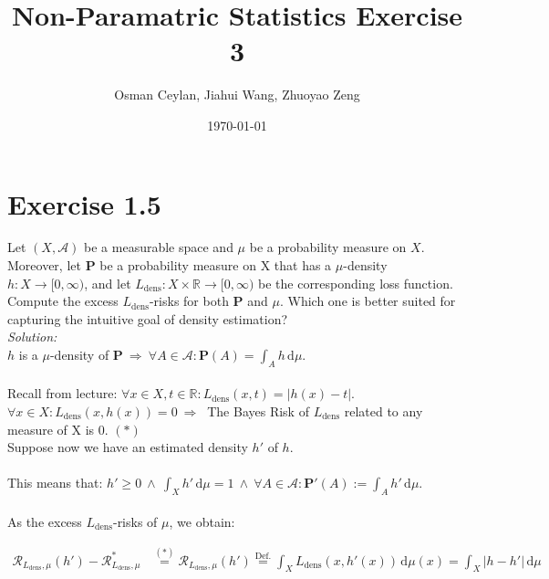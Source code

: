 \documentclass{article}
\title{Non-Paramatric Statistics Exercise 3}
\author{Osman Ceylan, Jiahui Wang, Zhuoyao Zeng}
\date{\today}
\begin{document}
\maketitle
\section*{Exercise 1.5}
Let $(X,\mathcal{A})$ be a measurable space and $\mu$ be a probability measure on $X$. Moreover, let $\mathbf{P}$ be a probability measure on X that has a $\mu$-density $h: X \rightarrow [0,\infty)$, and let $L_{\text{dens}}: X \times \mathbb{R} \rightarrow [0,\infty)$ be the corresponding loss function. Compute the excess $L_{\text{dens}}$-risks for both $\mathbf{P}$ and $\mu$. Which one is better suited for capturing the intuitive goal of density estimation? \\
\textit{Solution: }\\
$h$ is a $\mu$-density of $\mathbf{P} \ \Rightarrow \  \forall A\in \mathcal{A}: \mathbf{P}(A) = \displaystyle{\int_A h \, \text{d}\mu}$.\\
\vspace*{-1.3em}\\
Recall from  lecture: $\forall x\in X, t\in \mathbb{R}: L_{\text{dens}}(x,t) = |h(x)-t|$.\\
$\forall x\in X:  L_{\text{dens}}(x,h(x)) =  0 \ \Rightarrow \  $ The Bayes Risk of $L_{\text{dens}}$ related to any measure of X is 0. \hspace{2em}$(*)$\\
Suppose now we have an estimated density $h'$ of $h$.\\
\vspace*{-1.5em}\\
This means that: $h'\geq 0 \ \land \ \displaystyle{\int_X h' \, \text{d}\mu = 1} \ \land \ \forall A\in \mathcal{A}:\mathbf{P}'(A):= \displaystyle{\int_A h' \, \text{d}\mu } $.\\
\vspace*{-1.3em}\\
As the excess $L_{\text{dens}}$-risks of $\mu$, we obtain:
\begin{spacing}{1.8} \vspace*{-1.3cm}
\begin{align*}
\mathcal{R}_{L_{\text{dens}},\mu}(h')-\mathcal{R}_{L_{\text{dens}},\mu}^* & \overset{(*)}{=} \mathcal{R}_{L_{\text{dens}},\mu}(h') \overset{\text{Def.}}{=}  \displaystyle{ \int_X L_{\text{dens}}(x,h'(x)) \,  \text{d}\mu(x) }  =  \displaystyle{ \int_X |h-h'| \,  \text{d}\mu } 
\end{align*}
\end{spacing}
\end{document}
